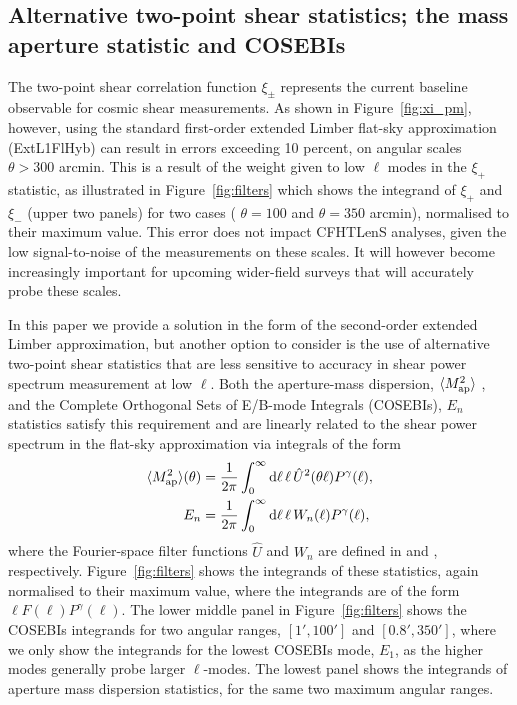 \subsection{Alternative two-point shear statistics; the mass aperture statistic
and COSEBIs}

The two-point shear correlation function $\xi_\pm$ represents the current
baseline observable for cosmic shear measurements.   As shown in
Figure~\ref{fig:xi_pm}, however, using the standard first-order extended
Limber flat-sky approximation (ExtL1FlHyb) can result in errors exceeding 10
percent, on angular scales $\theta > 300$ arcmin.    This is a result of the
weight given to low $\ell$ modes in the $\xi_+$ statistic, as
illustrated in Figure~\ref{fig:filters} which shows the integrand of $\xi_+$
and $\xi_-$ (upper two panels) for two cases ( $\theta = 100$ and $\theta =
350$ arcmin), normalised to their maximum value.   This error does not impact
CFHTLenS analyses, given the low signal-to-noise of the measurements on these
scales.  It will however become increasingly important for upcoming wider-field
surveys that will accurately probe these scales.

In this paper we provide a solution in the form of the second-order extended
Limber approximation, but another option to consider is the use of alternative two-point
shear statistics that are less sensitive to accuracy in shear power spectrum
measurement at low $\ell$.   Both the aperture-mass dispersion, $\langle M_
{\rm ap}^2 \rangle$ \citep{1998MNRAS.296..873S}, and the Complete Orthogonal
Sets of E/B-mode Integrals (COSEBIs), $E_n$ \citep{COSEBIs} statistics satisfy
this requirement and are linearly related to the shear power spectrum in the
flat-sky approximation via integrals of the form 
%
\begin{align}
  \langle M_ {\rm ap}^2 \rangle(\theta) & = \frac 1 {2\pi} \int_0^{\infty}{\rm d} \ell \, \ell \,
  \hat U^2(\theta\ell) P^\gamma(\ell),
  \label{eqn:integ}
  \\
  E_n & = \frac 1 {2\pi} \int_0^{\infty}{\rm d} \ell \, \ell \, W_n(\ell) P^\gamma(\ell),
\end{align}
%
where the Fourier-space filter functions $\hat U$ and $W_n$ are defined in
\cite{1998MNRAS.296..873S} and \cite{COSEBIs}, respectively.
Figure~\ref{fig:filters} shows the integrands of these statistics, again
normalised to their maximum value, where the integrands are of the form $\ell
F(\ell) P^\gamma(\ell)$.  The lower middle panel in Figure~\ref{fig:filters}
shows the COSEBIs integrands for two angular ranges, $[1',100']$ and
$[0.8',350']$, where we only show the integrands for the lowest COSEBIs mode,
$E_1$, as the higher modes generally probe larger $\ell$-modes.  The lowest
panel shows the integrands of aperture mass dispersion statistics, for the same
two maximum angular ranges. 

